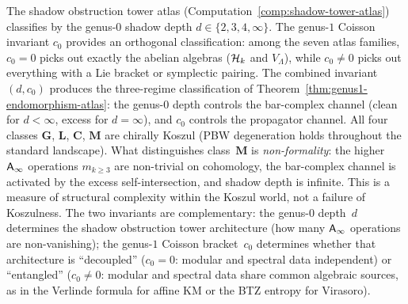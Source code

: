 \begin{remark}%
\label{rem:genus1-dichotomy}%
%
%
The shadow obstruction tower atlas
(Computation~\ref{comp:shadow-tower-atlas}) classifies by
the genus-$0$ shadow depth $d \in \{2,3,4,\infty\}$.
The genus-$1$ Coisson invariant $c_0$ provides an
orthogonal classification: among the seven atlas families,
$c_0 = 0$ picks out exactly the abelian algebras
($\mathcal{H}_k$ and $V_\Lambda$), while $c_0 \ne 0$ picks
out everything with a Lie bracket or symplectic pairing.
The combined invariant $(d, c_0)$ produces the
three-regime classification of
Theorem~\ref{thm:genus1-endomorphism-atlas}:
the genus-$0$ depth controls the bar-complex channel
(clean for $d < \infty$, excess for $d = \infty$),
and $c_0$ controls the propagator channel.
All four classes $\mathbf{G}$, $\mathbf{L}$,
$\mathbf{C}$, $\mathbf{M}$ are chirally Koszul (PBW
degeneration holds throughout the standard landscape).
What distinguishes class~$\mathbf{M}$ is
\emph{non-formality}: the higher $\mathsf{A}_{\infty}$ operations
$m_{k \ge 3}$ are non-trivial on cohomology,
the bar-complex channel is activated by the excess
self-intersection, and shadow depth is infinite.
This is a measure of structural complexity within the
Koszul world, not a failure of Koszulness.
The two invariants are complementary: the genus-$0$ depth~$d$
determines the shadow obstruction tower architecture (how many $\mathsf{A}_{\infty}$
operations are non-vanishing); the genus-$1$ Coisson bracket~$c_0$
determines whether that architecture is ``decoupled''
($c_0 = 0$: modular and spectral data independent) or
``entangled'' ($c_0 \ne 0$: modular and spectral data share
common algebraic sources, as in the Verlinde formula for
affine KM or the BTZ entropy for Virasoro).
\end{remark}

